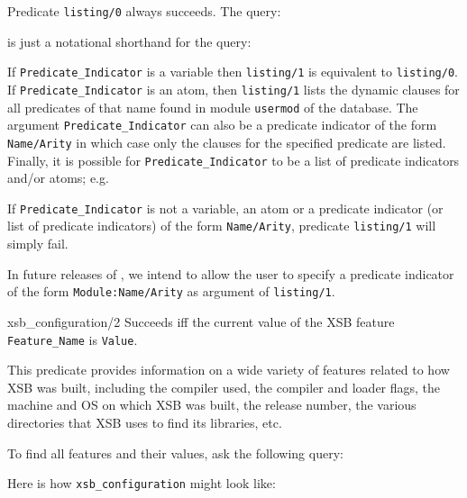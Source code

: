 \begin{description}
    Predicate {\tt listing/0} always succeeds.  The query:


    \noindent
    is just a notational shorthand for the query:


    If {\tt Predicate\_Indicator} is a variable then {\tt listing/1} is
    equivalent to {\tt listing/0}.
    If {\tt Predicate\_Indicator} is an atom, then {\tt listing/1} 
    lists the dynamic clauses for all predicates of that name found in 
    module {\tt usermod} of the database.
    The argument {\tt Predicate\_Indicator} can also be a predicate 
    indicator of the form {\tt Name/Arity} in which case only the 
    clauses for the specified predicate are listed.
    Finally, it is possible for {\tt Predicate\_Indicator}
    to be a list of predicate indicators and/or atoms; e.g.


    If {\tt Predicate\_Indicator} is not a variable, an atom or a predicate 
    indicator (or list of predicate indicators) of the form {\tt Name/Arity}, 
    predicate {\tt listing/1} will simply fail.

    In future releases of \ourprolog, we intend to allow the user to
    specify a predicate indicator of the form {\tt Module:Name/Arity} 
    as argument of {\tt listing/1}.

{xsb\_configuration/2}
    Succeeds iff the current value of the XSB  feature {\tt
    Feature\_Name} is {\tt Value}.

    This predicate provides information on a wide variety of features
    related to how XSB was built, including the compiler used, the compiler
    and loader flags, the machine and OS on which XSB was built, the
    release number, the various directories that XSB uses to find its
    libraries, etc.

    To find all features and their values, ask the following query:


    Here is how {\tt xsb\_configuration} might look like:


\end{description}

